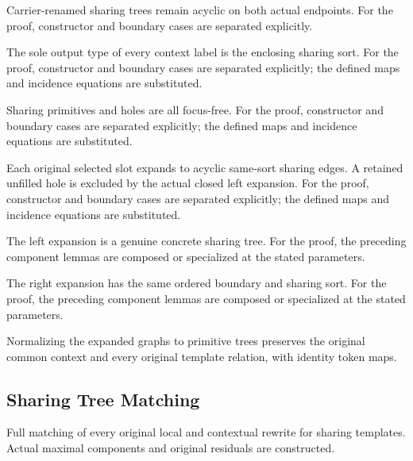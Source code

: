 Carrier-renamed sharing trees remain acyclic on both actual endpoints.
For the proof, constructor and boundary cases are separated explicitly.
\par{}

The sole output type of every context label is the enclosing sharing sort.
For the proof, constructor and boundary cases are separated explicitly; the defined maps and incidence equations are substituted.
\par{}

Sharing primitives and holes are all focus-free.
For the proof, constructor and boundary cases are separated explicitly; the defined maps and incidence equations are substituted.
\par{}

Each original selected slot expands to acyclic same-sort sharing edges. A retained unfilled hole is excluded by the actual closed left expansion.
For the proof, constructor and boundary cases are separated explicitly; the defined maps and incidence equations are substituted.
\par{}

The left expansion is a genuine concrete sharing tree.
For the proof, the preceding component lemmas are composed or specialized at the stated parameters.
\par{}

The right expansion has the same ordered boundary and sharing sort.
For the proof, the preceding component lemmas are composed or specialized at the stated parameters.
\par{}

Normalizing the expanded graphs to primitive trees preserves the original common context and every original template relation, with identity token maps.
\par{}

\subsection{Sharing Tree Matching}
Full matching of every original local and contextual rewrite for sharing templates. Actual maximal components and original residuals are constructed.

